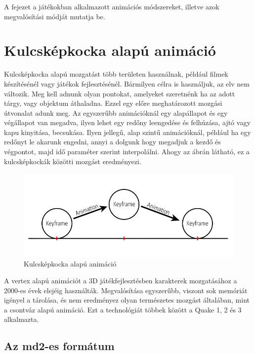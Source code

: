 \label{Chap:animacio}

A fejezet a játékokban alkalmazott animációs módszereket, illetve azok megvalósítási módját mutatja be.

\section{Kulcsképkocka alapú animáció}

Kulcsképkocka alapú mozgatást több területen használnak, például filmek készítésénél vagy játékok fejlesztésénél. Bármilyen célra is használjuk, az elv nem változik. Meg kell adnunk olyan pontokat, amelyeket szeretnénk ha az adott tárgy, vagy objektum áthaladna. Ezzel egy előre meghatározott mozgási útvonalat adunk meg. Az egyszerűbb animációknál egy alapállapot és egy végállapot van megadva, ilyen lehet egy redőny leengedése és felhúzása, ajtó vagy kapu kinyitása, becsukása. Ilyen jellegű, alap szintű animációknál, például ha egy redőnyt le akarunk engedni, annyi a dolgunk hogy megadjuk a kezdő és végpontot, majd idő paraméter szerint interpolálni. Ahogy az  ábrán látható, ez a kulcsképkockák közötti mozgást eredményezi.

\begin{figure}[h]
\centering
\includegraphics[scale=0.5]{kepek/keyframe_anim.png}
\caption{Kulcsképkocka alapú animáció}
\label{fig:keyframe}
\end{figure}

A vertex alapú animációt a 3D játékfejlesztésben karakterek mozgatásához a 2000-es évek elejéig használták. Megvalósítása egyszerűbb, viszont sok memóriát igényel a tárolása, és nem eredményez olyan természetes mozgást általában, mint a csontváz alapú animáció. Ezt a technológiát többek között a Quake 1, 2 és 3 alkalmazta.

\subsection{Az md2-es formátum}

